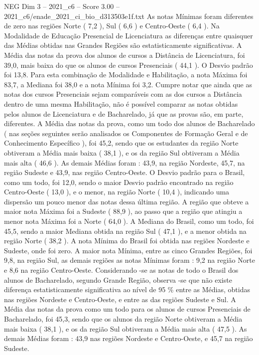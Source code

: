\begin{textsample}{NEG Dim 3 – 2021\_c6 – Score 3.00 – 2021\_c6/enade\_2021\_ci\_bio\_d313503e1f.txt}
As notas Mínimas foram diferentes de zero nas regiões Norte ( 7,2 ), Sul ( 6,6 ) e Centro-Oeste ( 6,4 ).
Na Modalidade de Educação Presencial de Licenciatura as diferenças entre quaisquer das Médias obtidas nas Grandes Regiões são estatisticamente significativas.
A Média das notas da prova dos alunos de cursos a Distância de Licenciatura, foi 39,0, mais baixa do que os alunos de cursos Presenciais ( 44,1 ).
O Desvio padrão foi 13,8.
Para esta combinação de Modalidade e Habilitação, a nota Máxima foi 83,7, a Mediana foi 38,0 e a nota Mínima foi 3,2.
Cumpre notar que ainda que as notas dos cursos Presenciais sejam comparáveis com as dos cursos a Distância dentro de uma mesma Habilitação, não é possível comparar as notas obtidas pelos alunos de Licenciatura e de Bacharelado, já que as provas são, em parte, diferentes.
A Média das notas da prova, como um todo dos alunos de Bacharelado ( nas seções seguintes serão analisados os Componentes de Formação Geral e de Conhecimento Específico ), foi 45,2, sendo que os estudantes da região Norte obtiveram a Média mais baixa ( 38,1 ), e os da região Sul obtiveram a Média mais alta ( 46,6 ).
As demais Médias foram : 43,9, na região Nordeste, 45,7, na região Sudeste e 43,9, nas região Centro-Oeste.
O Desvio padrão para o Brasil, como um todo, foi 12,0, sendo o maior Desvio padrão encontrado na região Centro-Oeste ( 13,0 ), e o menor, na região Norte ( 10,4 ), indicando uma dispersão um pouco menor das notas dessa última região.
A região que obteve a maior nota Máxima foi a Sudeste ( 88,9 ), ao passo que a região que atingiu a menor nota Máxima foi a Norte ( 64,0 ).
A Mediana do Brasil, como um todo, foi 45,5, sendo a maior Mediana obtida na região Sul ( 47,1 ), e a menor obtida na região Norte ( 38,2 ).
A nota Mínima do Brasil foi obtida nas regiões Nordeste e Sudeste, onde foi zero.
A maior nota Mínima, entre as cinco Grandes Regiões, foi 9,8, na região Sul, as demais regiões as notas Mínimas foram : 9,2 na região Norte e 8,6 na região Centro-Oeste.
Considerando -se as notas de todo o Brasil dos alunos de Bacharelado, segundo Grande Região, observa -se que não existe diferença estatisticamente significativa ao nível de 95 \% entre as Médias, obtidas nas regiões Nordeste e Centro-Oeste, e entre as das regiões Sudeste e Sul.
A Média das notas da prova como um todo para os alunos de cursos Presenciais de Bacharelado, foi 45,3, sendo que os alunos da região Norte obtiveram a Média mais baixa ( 38,1 ), e os da região Sul obtiveram a Média mais alta ( 47,5 ).
As demais Médias foram : 43,9 nas regiões Nordeste e Centro-Oeste, e 45,7 na região Sudeste.

\end{textsample}
